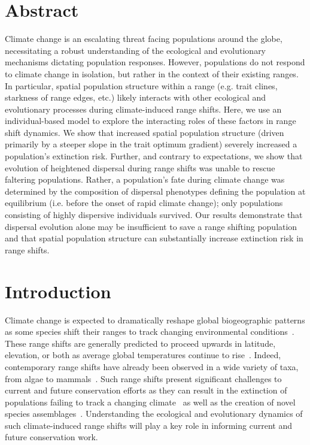 \documentclass[11pt]{article}
\begin{document}
\section*{Abstract}
Climate change is an escalating threat facing populations around the globe, necessitating a robust understanding of the ecological and evolutionary mechanisms dictating population responses. However, populations do not respond to climate change in isolation, but rather in the context of their existing ranges. In particular, spatial population structure within a range (e.g. trait clines, starkness of range edges, etc.) likely interacts with other ecological and evolutionary processes during climate-induced range shifts. Here, we use an individual-based model to explore the interacting roles of these factors in range shift dynamics. We show that increased spatial population structure (driven primarily by a steeper slope in the trait optimum gradient) severely increased a population's extinction risk. Further, and contrary to expectations, we show that evolution of heightened dispersal during range shifts was unable to rescue faltering populations. Rather, a population's fate during climate change was determined by the composition of dispersal phenotypes defining the population at equilibrium (i.e. before the onset of rapid climate change); only populations consisting of highly dispersive individuals survived. Our results demonstrate that dispersal evolution alone may be insufficient to save a range shifting population and that spatial population structure can substantially increase extinction risk in range shifts.

\newpage{}

\section*{Introduction}
Climate change is expected to dramatically reshape global biogeographic patterns as some species shift their ranges to track changing environmental conditions~\citep{gonzalez2010global}. These range shifts are generally predicted to proceed upwards in latitude, elevation, or both as average global temperatures continue to rise~\citep{loarie2009velocity}. Indeed, contemporary range shifts have already been observed in a wide variety of taxa, from algae to mammals~\citep{chen2011rapid, parmesan2006ecological}. Such range shifts present significant challenges to current and future conservation efforts as they can result in the extinction of populations failing to track a changing climate~\citep{parmesan2006ecological} as well as the creation of novel species assemblages~\citep{hobbs2009novel}. Understanding the ecological and evolutionary dynamics of such climate-induced range shifts will play a key role in informing current and future conservation work.
\end{document}

